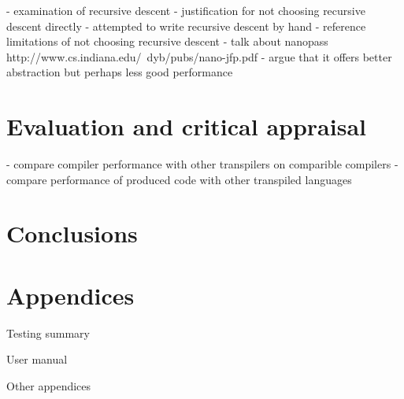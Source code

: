 \documentclass{article}
\begin{document}
- examination of recursive descent 
- justification for not choosing recursive descent directly
    - attempted to write recursive descent by hand
- reference limitations of not choosing recursive descent
- talk about nanopass
 http://www.cs.indiana.edu/~dyb/pubs/nano-jfp.pdf
- argue that it offers better abstraction but perhaps less good performance

 
\section{Evaluation and critical appraisal}


- compare compiler performance with other transpilers on comparible compilers
- compare performance of produced code with other transpiled languages

\section{Conclusions}


\section{Appendices}

Testing summary


User manual
 

Other appendices
\end{document}
